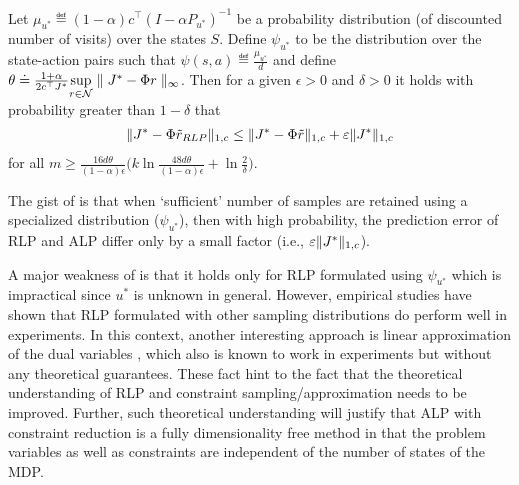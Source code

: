 \begin{theorem}\label{rlpt}
Let $\mu_{u^*}\eqdef(1-\alpha)c^\top (I-\alpha P_{u^*})^{-1}$ be a probability distribution (of discounted number of visits) over the states $S$. Define $\psi_{u^*}$ to be the distribution over the state-action pairs such that $\psi(s,a)\eqdef \frac{\mu_{u^*}}{d}$ and define $\theta\doteq\frac{1+\alpha}{2 c^\top J^*}\underset{r\in \mathcal{N}}{\sup}\parallel J^*-\Phi r \parallel_\infty$. Then for a given $\epsilon>0$ and $\delta>0$ it holds with probability greater than $1-\delta$ that
\begin{align*}
\|J^*-\Phi\tilde{r}_{RLP}\|_{1,c}\leq \|J^*-\Phi\tilde{r}\|_{1,c}+\varepsilon \|J^*\|_{1,c}
\end{align*}
for all $m\geq \frac{16d\theta}{(1-\alpha)\epsilon}\big(k\ln\frac{48d\theta}{(1-\alpha)\epsilon}+\ln \frac{2}{\delta}\big)$.
\end{theorem}
The gist of  is that when `sufficient' number of samples are retained using a specialized distribution ($\psi_{u^*}$), then with high probability, the prediction error of RLP and ALP differ only by a small factor (i.e., $\varepsilon\|J^*\|_{1,c}$).\par
A major weakness of  is that it holds only for RLP formulated using $\psi_{u^*}$ which is impractical since $u^*$ is unknown in general. However, empirical studies \cite{ALP,CS,CST} have shown that RLP formulated with other sampling distributions do perform well in experiments. In this context, another interesting approach is linear approximation of the dual variables \cite{dolgov}, which also is known to work in experiments but without any theoretical guarantees. These fact hint to the fact that the theoretical understanding of RLP and constraint sampling/approximation needs to be improved. Further, such theoretical understanding will justify that ALP with constraint reduction is a fully dimensionality free method in that the problem variables as well as constraints are independent of the number of states of the MDP.
\begin{comment}
The Generalized Reduced Linear Program is given as:
\begin{align}\label{grlp}
\begin{split}
&\text{GRLP:~}\underset{r\in \N\subset R^k}{\min}\, \, c^\top \Phi r\,\,\,\,\\
&  \,W^\top E\Phi r\geq W^\top H \Phi r.
\end{split}
\end{align}
\end{comment}
